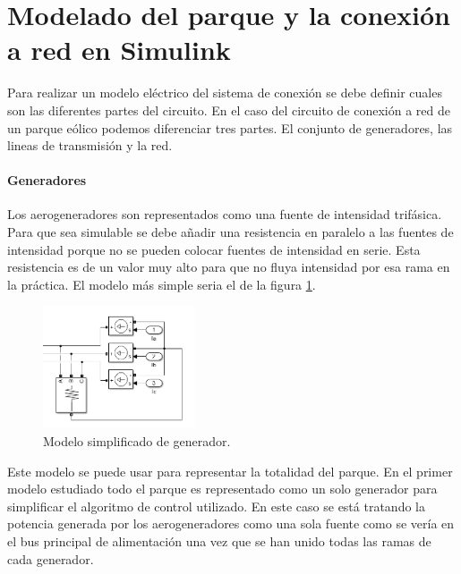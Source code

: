 \documentclass{book}
\begin{document}
	\section{Modelado del parque y la conexi\'on a red en Simulink}

Para realizar un modelo el\'ectrico del sistema de conexi\'on se debe definir cuales son las diferentes partes del circuito. En el caso del circuito de conexi\'on a red de un parque e\'olico podemos diferenciar tres partes. El conjunto de generadores, las lineas de transmisi\'on y la red. \par 

		\paragraph{Generadores}

Los aerogeneradores son representados como una fuente de intensidad trif\'asica. Para que sea simulable se debe añadir una resistencia en paralelo a las fuentes de intensidad porque no se pueden colocar fuentes de intensidad en serie. Esta resistencia es de un valor muy alto para que no fluya intensidad por esa rama en la pr\'actica. El modelo más simple seria el de la figura \ref{SimpleGenerator}. \par

\begin{figure}[h!]
\centering
\includegraphics[width=0.4\textwidth]{SimpleGenerator.PNG}
\caption{Modelo simplificado de generador. }
\label{SimpleGenerator}
\end{figure} \par

Este modelo se puede usar para representar la totalidad del parque. En el primer modelo estudiado todo el parque es representado como un solo generador para simplificar el algoritmo de control utilizado. En este caso se est\'a tratando la potencia generada por los aerogeneradores como una sola fuente como se ver\'ia en el bus principal de alimentaci\'on una vez que se han unido todas las ramas de cada generador. \par
\end{document}
